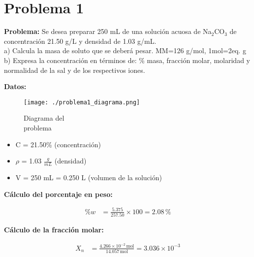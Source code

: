 \documentclass{article}
\begin{document}
\newpage
\section*{Problema 1}





\textbf{Problema:} Se desea preparar 250 mL de una solución acuosa de Na$_2$CO$_3$ de concentración 21.50 g/L y densidad de 1.03 g/mL. \\
a) Calcula la masa de soluto que se deberá pesar. MM=126 g/mol, 1mol=2eq. g \\
b) Expresa la concentración en términos de: \% masa, fracción molar, molaridad y normalidad de la sal y de los respectivos iones.

\begin{multicols}{2} %
\noindent\textbf{Datos:} %

\begin{figure}[H]
    \begin{minipage}[t]{0.3\textwidth} %
        \raggedright %
        \texttt{[image: ./problema1\_diagrama.png]} %
        \caption{Diagrama del \\ problema}
    \end{minipage}
\end{figure}

\textbf{} %
\begin{itemize}
\item C = 21.50\% (concentración)
\item $\rho$ = 1.03 $\frac{g}{mL}$ (densidad)
\item V = 250 mL = 0.250 L (volumen de la solución)
\end{itemize}
\textbf{Cálculo del porcentaje en peso:}

\begin{align*}
    \%w &= \frac{5.375}{257.50} \times 100 = 2.08 \, \%
\end{align*}

\textbf{Cálculo de la fracción molar:}

\begin{align*}
    X_n &= \frac{4.266 \times 10^{-2} \, \text{mol}}{14.057 \, \text{mol}} = 3.036 \times 10^{-3}
\end{align*}


\end{multicols}
\end{document}
